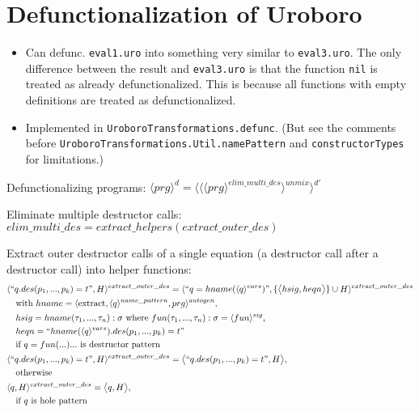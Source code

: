 \documentclass[11pt]{article} %
\begin{document}
\section{Defunctionalization of Uroboro}

\begin{itemize}
\item Can defunc. \texttt{eval1.uro} into something very similar to \texttt{eval3.uro}. The only difference between the result and \texttt{eval3.uro} is that the function \texttt{nil} is treated as already defunctionalized. This is because all functions with empty definitions are treated as defunctionalized.

\item Implemented in \texttt{UroboroTransformations.defunc}. (But see the comments before \texttt{UroboroTransformations.Util.namePattern} and \texttt{constructorTypes} for limitations.)

\end{itemize}

Defunctionalizing programs: $\langle prg \rangle^d = \langle \langle \langle prg \rangle^{elim\_multi\_des} \rangle^{unmix} \rangle^{d'}$

Eliminate multiple destructor calls: $elim\_multi\_des = extract\_helpers(extract\_outer\_des)$

Extract outer destructor calls of a single equation (a destructor call after a destructor call) into helper functions:
\begin{alignat*}{2}
& \langle `` q.des(p_1, ..., p_k) = t ", H \rangle^{extract\_outer\_des} = \langle `` q = hname(\langle q \rangle^{vars})  ", \{ \big\langle hsig, heqn \big\rangle \} \cup H \rangle^{extract\_outer\_des} \\
&\quad \textrm{with } hname = \langle \textrm{extract}, \langle q \rangle^{name\_pattern}, prg \rangle^{autogen}, \\
&\quad hsig = hname(\tau_1, ..., \tau_n): \sigma \textrm{ where } fun(\tau_1, ..., \tau_n): \sigma = \langle fun \rangle^{sig}, \\
&\quad heqn = `` hname(\langle q \rangle^{vars}).des(p_1, ..., p_k) = t  " \\
&\quad \textrm{if $q = fun(...) ...$ is destructor pattern } \\
& \langle `` q.des(p_1, ..., p_k) = t ", H \rangle^{extract\_outer\_des} = \big\langle `` q.des(p_1, ..., p_k) = t ", H \big\rangle, \\
&\quad \textrm{otherwise} \\
& \langle q, H \rangle^{extract\_outer\_des} = \big\langle q, H \big\rangle, \\
&\quad \textrm{if $q$ is hole pattern}
\end{alignat*}
\end{document}
